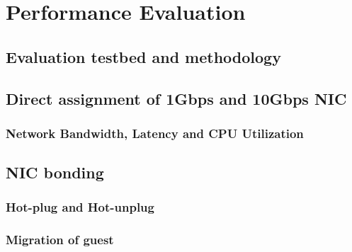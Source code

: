 \section{Performance Evaluation}

\subsection{Evaluation testbed and methodology}

\subsection{Direct assignment of 1Gbps and 10Gbps NIC}

\subsubsection{Network Bandwidth, Latency and CPU Utilization}

\subsection{NIC bonding}

\subsubsection{Hot-plug and Hot-unplug}

\subsubsection{Migration of guest}

